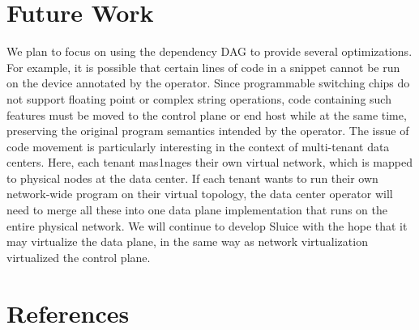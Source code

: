 \section{Future Work}
We plan to focus on using the dependency DAG to provide several optimizations. For example, it is possible that certain lines of code in a snippet cannot be run on the device annotated by the operator. Since programmable switching chips do not support floating point or complex string operations, code containing such features must be moved to the control plane or end host while at the same time, preserving the original program semantics intended by the operator. The issue of code movement is particularly interesting in the context of multi-tenant data centers. Here, each tenant mas1nages their own virtual network, which is mapped to physical nodes at the data center. If each tenant wants to run their own network-wide program on their virtual topology, the data center operator will need to merge all these into one data plane implementation that runs on the entire physical network. We will continue to develop Sluice with the hope that it may virtualize the data plane, in the same way as network virtualization virtualized the control plane.

\section{References}
